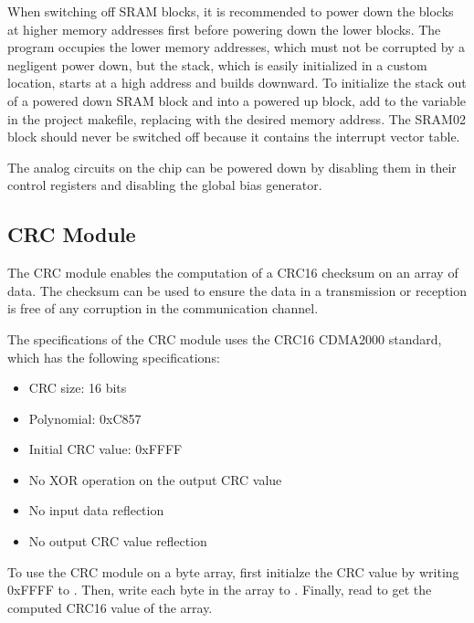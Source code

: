 When switching off SRAM blocks, it is recommended to power down the blocks at higher memory addresses first before powering down the lower blocks. The program occupies the lower memory addresses, which must not be corrupted by a negligent power down, but the stack, which is easily initialized in a custom location, starts at a high address and builds downward. To initialize the stack out of a powered down SRAM block and into a powered up block, add  to the  variable in the project makefile, replacing  with the desired memory address. The SRAM02 block should never be switched off because it contains the interrupt vector table.

The analog circuits on the chip can be powered down by disabling them in their control registers and disabling the global bias generator.

\subsection{CRC Module}
The CRC module enables the computation of a CRC16 checksum on an array of data. The checksum can be used to ensure the data in a transmission or reception is free of any corruption in the communication channel.

The specifications of the CRC module uses the CRC16 CDMA2000 standard, which has the following specifications:
\begin{itemize}
\item CRC size: 16 bits
\item Polynomial: 0xC857
\item Initial CRC value: 0xFFFF
\item No XOR operation on the output CRC value
\item No input data reflection
\item No output CRC value reflection
\end{itemize}

To use the CRC module on a byte array, first initialze the CRC value by writing 0xFFFF to . Then, write each byte in the array to . Finally, read  to get the computed CRC16 value of the array.

